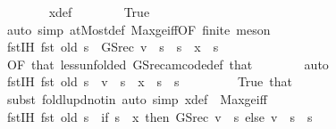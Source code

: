 \begin{isabellebody}
\ \ \ \ \ \ \isamarkupfalse%
\ x{\isacharprime}{\kern0pt}{\isacharunderscore}{\kern0pt}def\isanewline
\ \ \ \ \ \ \isamarkupfalse%
\ True\isanewline
\ \ \ \ \ \ \isamarkupfalse%
\ {\isacharparenleft}{\kern0pt}auto\ simp{\isacharcolon}{\kern0pt}\ atMost{\isacharunderscore}{\kern0pt}def\ Max{\isacharunderscore}{\kern0pt}ge{\isacharunderscore}{\kern0pt}iff{\isacharbrackleft}{\kern0pt}OF\ finite{\isacharbrackright}{\kern0pt}{\isacharparenright}{\kern0pt}\ meson\isanewline
\ \ \ \ \isamarkupfalse%
\ fst{\isacharunderscore}{\kern0pt}IH{\isacharcolon}{\kern0pt}\ {\isachardoublequoteopen}fst\ {\isacharparenleft}{\kern0pt}{\isacharquery}{\kern0pt}old\ s{\isacharparenright}{\kern0pt}\ {\isacharequal}{\kern0pt}\ GS{\isacharunderscore}{\kern0pt}rec\ v\ {\isachardollar}{\kern0pt}\ s{\isachardoublequoteclose}\ \ {\isachardoublequoteopen}s\ {\isacharless}{\kern0pt}\ x{\isachardoublequoteclose}\ \ s\isanewline
\ \ \ \ \ \ \isamarkupfalse%
\ {}{\isacharbrackleft}{\kern0pt}OF\ that{\isacharbrackright}{\kern0pt}\ less{\isacharbrackleft}{\kern0pt}unfolded\ GS{\isacharunderscore}{\kern0pt}rec{\isacharunderscore}{\kern0pt}am{\isacharunderscore}{\kern0pt}code{\isacharunderscore}{\kern0pt}def{\isacharbrackright}{\kern0pt}\ that\isanewline
\ \ \ \ \ \ \isamarkupfalse%
\ auto\isanewline
\ \ \ \ \isamarkupfalse%
\ fst{\isacharunderscore}{\kern0pt}IH{\isacharprime}{\kern0pt}{\isacharcolon}{\kern0pt}\ {\isachardoublequoteopen}fst\ {\isacharparenleft}{\kern0pt}{\isacharquery}{\kern0pt}old\ s{\isacharparenright}{\kern0pt}\ {\isacharequal}{\kern0pt}\ v\ {\isachardollar}{\kern0pt}\ s{\isachardoublequoteclose}\ \ {\isachardoublequoteopen}x\ {\isasymle}\ s{\isachardoublequoteclose}\ \ s\ \isanewline
\ \ \ \ \ \ \isamarkupfalse%
\ True\ that\isanewline
\ \ \ \ \ \ \isamarkupfalse%
\ {\isacharparenleft}{\kern0pt}subst\ foldl{\isacharunderscore}{\kern0pt}upd{\isacharunderscore}{\kern0pt}notin{\isacharparenright}{\kern0pt}\ {\isacharparenleft}{\kern0pt}auto\ simp{\isacharcolon}{\kern0pt}\ x{\isacharprime}{\kern0pt}{\isacharunderscore}{\kern0pt}def\ \ Max{\isacharunderscore}{\kern0pt}ge{\isacharunderscore}{\kern0pt}iff{\isacharparenright}{\kern0pt}\isanewline
\ \ \ \ \isamarkupfalse%
\ fst{\isacharunderscore}{\kern0pt}IH{\isacharprime}{\kern0pt}{\isacharprime}{\kern0pt}{\isacharcolon}{\kern0pt}\ {\isachardoublequoteopen}fst\ {\isacharparenleft}{\kern0pt}{\isacharquery}{\kern0pt}old\ s{\isacharparenright}{\kern0pt}\ {\isacharequal}{\kern0pt}\ {\isacharparenleft}{\kern0pt}if\ s\ {\isacharless}{\kern0pt}\ x\ then\ GS{\isacharunderscore}{\kern0pt}rec\ v\ {\isachardollar}{\kern0pt}\ s\ else\ v\ {\isachardollar}{\kern0pt}\ s{\isacharparenright}{\kern0pt}{\isachardoublequoteclose}\ \ s\isanewline

\end{isabellebody}
